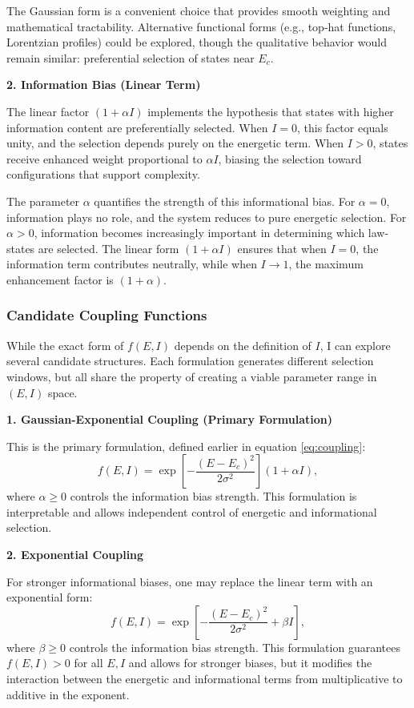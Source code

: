 \documentclass[12pt,a4paper]{article}
\theoremstyle{definition}
\theoremstyle{remark}
\begin{document}
The Gaussian form is a convenient choice that provides smooth weighting and mathematical tractability. Alternative functional forms (e.g., top-hat functions, Lorentzian profiles) could be explored, though the qualitative behavior would remain similar: preferential selection of states near $E_c$.

\textbf{2. Information Bias (Linear Term)}

The linear factor $(1 + \alpha I)$ implements the hypothesis that states with higher information content are preferentially selected. When $I = 0$, this factor equals unity, and the selection depends purely on the energetic term. When $I > 0$, states receive enhanced weight proportional to $\alpha I$, biasing the selection toward configurations that support complexity.

The parameter $\alpha$ quantifies the strength of this informational bias. For $\alpha = 0$, information plays no role, and the system reduces to pure energetic selection. For $\alpha > 0$, information becomes increasingly important in determining which law-states are selected. The linear form $(1 + \alpha I)$ ensures that when $I = 0$, the information term contributes neutrally, while when $I \to 1$, the maximum enhancement factor is $(1 + \alpha)$.

\subsubsection{Candidate Coupling Functions}

While the exact form of $f(E,I)$ depends on the definition of $I$, I can explore several candidate structures. Each formulation generates different selection windows, but all share the property of creating a viable parameter range in $(E,I)$ space.

\textbf{1. Gaussian-Exponential Coupling (Primary Formulation)}

This is the primary formulation, defined earlier in equation \eqref{eq:coupling}:
\begin{equation}
f(E,I) = \exp\left[-\frac{(E - E_c)^2}{2\sigma^2}\right] (1 + \alpha I),
\end{equation}
where $\alpha \geq 0$ controls the information bias strength. This formulation is interpretable and allows independent control of energetic and informational selection.

\textbf{2. Exponential Coupling}

For stronger informational biases, one may replace the linear term with an exponential form:
\begin{equation}\label{eq:coupling_exp}
f(E,I) = \exp\left[-\frac{(E - E_c)^2}{2\sigma^2} + \beta I\right],
\end{equation}
where $\beta \geq 0$ controls the information bias strength. This formulation guarantees $f(E,I) > 0$ for all $E, I$ and allows for stronger biases, but it modifies the interaction between the energetic and informational terms from multiplicative to additive in the exponent.
\end{document}
